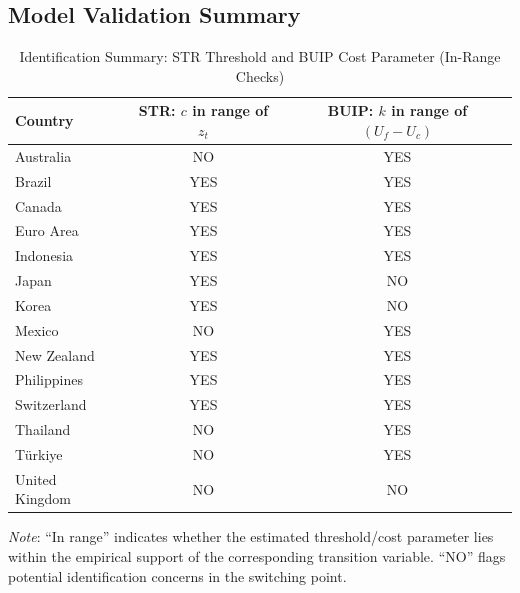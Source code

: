 \documentclass[a4paper,10pt,final]{article}    %
\begin{document}
\subsection{Model Validation Summary}
\label{app:validation_summary}

\begin{table}[htbp]

    \caption{Identification Summary: STR Threshold and BUIP Cost Parameter (In-Range Checks)}
    \label{tab:validation_summary}
    \centering
    \begin{tabular}{lcc}
        \toprule
        Country        & STR: $c$ in range of $z_t$ & BUIP: $k$ in range of $(U_f-U_c)$ \\
        \midrule
        Australia      & NO                         & YES                               \\
        Brazil         & YES                        & YES                               \\
        Canada         & YES                        & YES                               \\
        Euro Area      & YES                        & YES                               \\
        Indonesia      & YES                        & YES                               \\
        Japan          & YES                        & NO                                \\
        Korea          & YES                        & NO                                \\
        Mexico         & NO                         & YES                               \\
        New Zealand    & YES                        & YES                               \\
        Philippines    & YES                        & YES                               \\
        Switzerland    & YES                        & YES                               \\
        Thailand       & NO                         & YES                               \\
        Türkiye        & NO                         & YES                               \\
        United Kingdom & NO                         & NO                                \\
        \bottomrule
    \end{tabular}
    \begin{tablenotes}
        \small
        \textit{Note}: ``In range'' indicates whether the estimated threshold/cost parameter lies within the empirical support of the corresponding transition variable. ``NO'' flags potential identification concerns in the switching point.
    \end{tablenotes}
\end{table}
\end{document}
